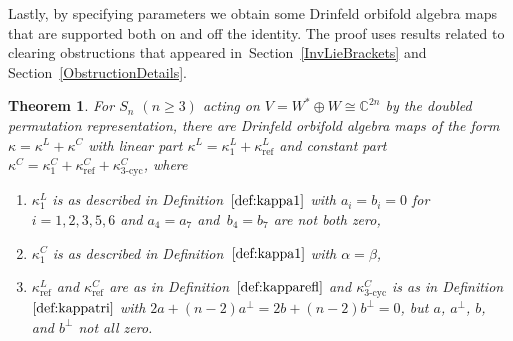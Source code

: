 \documentclass[10pt,a4paper]{amsart}
\numberwithin{equation}{section}
\newtheorem{Theorem}{Theorem}[section]
\DeclareMathOperator{\refl}{ref}
\DeclareMathOperator{\tri}{3-cyc}
\begin{document}
Lastly, by specifying parameters we obtain some Drinfeld orbifold algebra
maps that are supported both on and off the identity. The proof uses results
related to clearing obstructions that appeared in~Section~\ref{InvLieBrackets}
and Section~\ref{ObstructionDetails}.

\begin{Theorem}
\label{thm:DOAMapsCombined}
For $S_n$ $(n \geq 3)$ acting on $V=W^* \oplus W \cong \mathbb{C}^{2n}$ by the
doubled permutation representation, there are Drinfeld orbifold algebra maps
of the form $\kappa=\kappa^L+\kappa^C$
with linear part $\kappa^L=\kappa^L_1+\kappa^L_{\refl}$ and
constant part $\kappa^C=\kappa^C_1+\kappa^C_{\refl}+\kappa^C_{\tri}$, where
\begin{enumerate}\itemsep=0pt
\item[$(1)$] $\kappa^L_1$ is as described in Definition~$\ref{def:kappa1}$ with $a_i=b_i=0$
for $i=1, 2, 3, 5, 6$ and $a_4=a_7$ and~$b_4=b_7$ are not both zero,
\item[$(2)$] $\kappa^C_1$ is as described in Definition~$\ref{def:kappa1}$ with $\alpha=\beta$,
\item[$(3)$] $\kappa^L_{\refl}$ and $\kappa^C_{\refl}$ are as in Definition~$\ref{def:kapparefl}$ and
$\kappa^C_{\tri}$ is as in Definition~$\ref{def:kappatri}$ with
$2a+(n-2)a^\perp=2b+(n-2)b^\perp=0$, but $a$, $a^\perp$, $b$, and $b^\perp$ not all zero.
\end{enumerate}
\end{Theorem}
\end{document}
